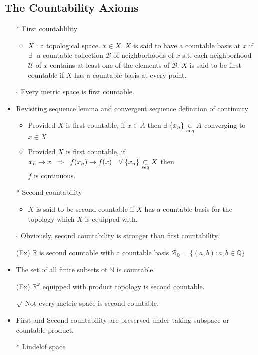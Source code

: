 \documentclass[12pt]{article}
\newcommand{\sq}{$\square$}
\newcommand{\rmk}{$\surd$}
\newcommand{\sptwo}{\hspace{0.2cm}}
\newcommand{\spone}{\hspace{0.1cm}}
\newcommand{\Nat}{\mathbb{N}}
\newcommand{\Real}{\mathbb{R}}
\newcommand{\U}{\mathcal{U}}
\newcommand{\B}{\mathcal{B}}
\newcommand{\seq}{\underset{seq}{\subset}}
\newcommand{\cl}{\overline}
\newcommand{\exist}{\exists\spone}
\begin{document}
\subsection{The Countability Axioms}
\smallskip
\begin{itemize}
	\item[*] First countablility
	\begin{itemize}
		\item $X$ : a topological space. $x\in X$. $X$ is said to have a countable basis at $x$ if $\exist$ a countable collection $\B$ of neighborhoods of $x$  s.t. each neighborhood $\U$ of $x$ contains at least one of the elements of $\B$. $X$ is said to be first countable if $X$ has a countable basis at every point.
	\end{itemize}
	\item[\sq] Every metric space is first countable.
	\item Revisiting sequence lemma and convergent sequence definition of continuity
	\begin{itemize}
		\item Provided $X$ is first countable, if $x\in \cl{A}$ then $\exist \{x_n\}\seq A$ converging to $x\in X$
		\item Provided $X$ is first countable, if $x_n\rightarrow x \sptwo \Rightarrow \sptwo f(x_n)\rightarrow f(x) \quad \forall \spone \{x_n\}\seq X$ then \\$f$ is continuous.
	\end{itemize}
	\item[*] Second countability
	\begin{itemize}
		\item $X$ is said to be second countable if $X$ has a countable basis for the topology which $X$ is equipped with.
	\end{itemize}
	\item[\sq] Obviously, second countability is stronger than first countability.
	\item[(Ex)]$\Real$ is second countable with a countable basis $\B_\mathbb{Q}=\{(a,b): a,b\in \mathbb{Q}\}$
	\item The set of all finite subsets of $\Nat$ is countable.
	\item[(Ex)] $\Real^\omega$ equipped with product topology is second countable.
	\item[\rmk] Not every metric space is second countable.
	\item First and Second countability are preserved under taking subspace or countable product.
	\item[*]Lindelof space

\end{itemize}
\end{document}
